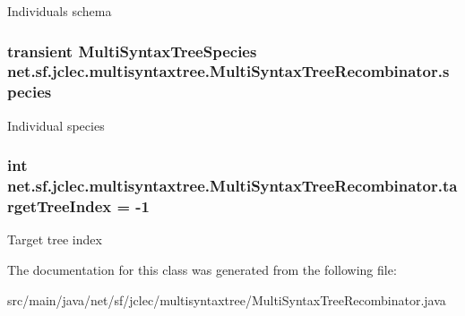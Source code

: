 Individuals schema \hypertarget{classnet_1_1sf_1_1jclec_1_1multisyntaxtree_1_1_multi_syntax_tree_recombinator_a43f95ba0d2803ec8ce1ff6a7d223a98e}{
\subsubsection[{species}]{\setlength{\rightskip}{0pt plus 5cm}transient {\bf Multi\-Syntax\-Tree\-Species} net.\-sf.\-jclec.\-multisyntaxtree.\-Multi\-Syntax\-Tree\-Recombinator.\-species\hspace{0.3cm}{\ttfamily [protected]}}}\label{classnet_1_1sf_1_1jclec_1_1multisyntaxtree_1_1_multi_syntax_tree_recombinator_a43f95ba0d2803ec8ce1ff6a7d223a98e}
Individual species \hypertarget{classnet_1_1sf_1_1jclec_1_1multisyntaxtree_1_1_multi_syntax_tree_recombinator_a30199d5b39c4b4c4f86a1e7d626a5798}{
\subsubsection[{target\-Tree\-Index}]{\setlength{\rightskip}{0pt plus 5cm}int net.\-sf.\-jclec.\-multisyntaxtree.\-Multi\-Syntax\-Tree\-Recombinator.\-target\-Tree\-Index = -\/1\hspace{0.3cm}{\ttfamily [protected]}}}\label{classnet_1_1sf_1_1jclec_1_1multisyntaxtree_1_1_multi_syntax_tree_recombinator_a30199d5b39c4b4c4f86a1e7d626a5798}
Target tree index 

The documentation for this class was generated from the following file\-:\begin{DoxyCompactItemize}
\item 
src/main/java/net/sf/jclec/multisyntaxtree/Multi\-Syntax\-Tree\-Recombinator.\-java\end{DoxyCompactItemize}
